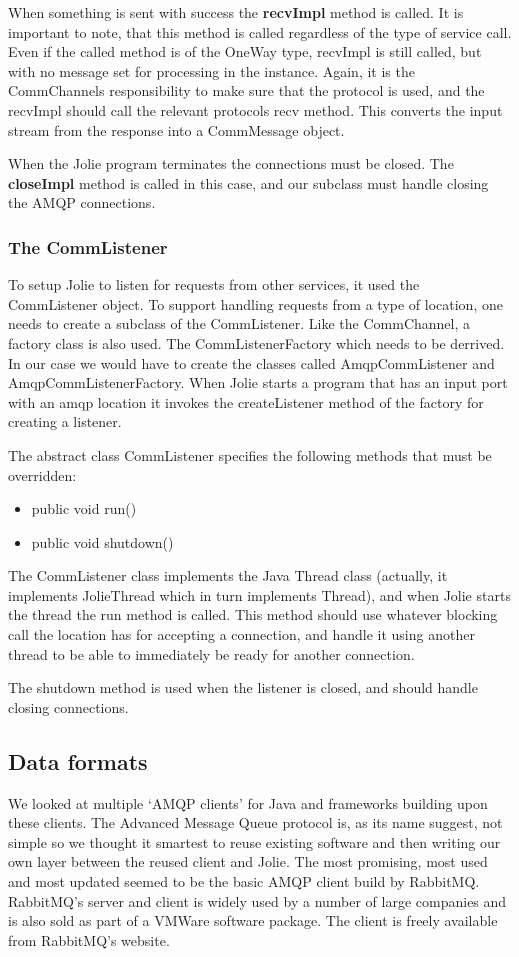 When something is sent with success the \textbf{recvImpl} method is called. It is important to note, that this method is called regardless of the type of service call. Even if the called method is of the OneWay type, recvImpl is still called, but with no message set for processing in the instance. Again, it is the CommChannels responsibility to make sure that the protocol is used, and the recvImpl should call the relevant protocols recv method. This converts the input stream from the response into a CommMessage object.

When the Jolie program terminates the connections must be closed. The \textbf{closeImpl} method is called in this case, and our subclass must handle closing the AMQP connections.

\subsubsection{The CommListener}
To setup Jolie to listen for requests from other services, it used the CommListener object. To support handling requests from a type of location, one needs to create a subclass of the CommListener. Like the CommChannel, a factory class is also used. The CommListenerFactory which needs to be derrived. In our case we would have to create the classes called AmqpCommListener and AmqpCommListenerFactory. When Jolie starts a program that has an input port with an amqp location it invokes the createListener method of the factory for creating a listener.

The abstract class CommListener specifies the following methods that must be overridden:
\begin{itemize}
  \item public void run()
  \item public void shutdown()
\end{itemize}

The CommListener class implements the Java Thread class (actually, it implements JolieThread which in turn implements Thread), and when Jolie starts the thread the run method is called. This method should use whatever blocking call the location has for accepting a connection, and handle it using another thread to be able to immediately be ready for another connection.

The shutdown method is used when the listener is closed, and should handle closing connections.

\subsection{Data formats}
\label{subsec:Data formats}
We looked at multiple `AMQP clients' for Java and frameworks building upon these clients. The Advanced Message Queue protocol is, as its name suggest, not simple so we thought it smartest to reuse existing software and then writing our own layer between the reused client and Jolie. The most promising, most used and most updated seemed to be the basic AMQP client build by RabbitMQ\cite{RabbitMqClient}. RabbitMQ's server and client is widely used by a number of large companies and is also sold as part of a VMWare software package\cite{vFabric}. The client is freely available from RabbitMQ's website.

